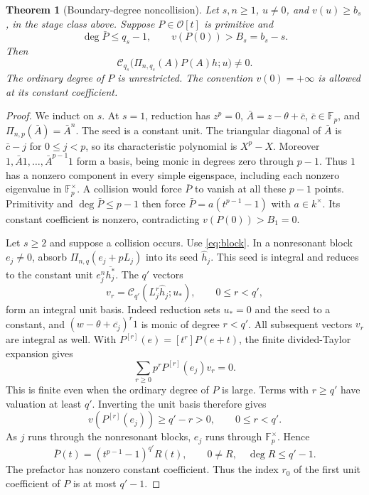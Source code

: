 \documentclass[11pt]{article}
\newtheorem{theorem}[lemma]{Theorem}
\begin{document}
\begin{theorem}[Boundary-degree noncollision]\label{thm:boundary}
Let $s,n\ge1$, $u\ne0$, and $v(u)\ge b_s$, in the stage class above.
Suppose $P\in\mathcal O[t]$ is primitive and
\[
 \deg\bar P\le q_s-1,\qquad v(P(0))>B_s=b_s-s.
\]
Then
\[
 \mathcal C_{q_s}\bigl(\Pi_{n,q_s}(A)P(A)h;u\bigr)\ne0.
\]
The ordinary degree of $P$ is unrestricted.
The convention $v(0)=+\infty$ is allowed at its constant coefficient.
\end{theorem}
\begin{proof}
We induct on $s$. At $s=1$, reduction has $z^p=0$,
$\bar A=z-\theta+\bar c$, $\bar c\in\mathbb F_p$,
and $\Pi_{n,p}(\bar A)=\bar A^n$.
The seed is a constant unit.
The triangular diagonal of $\bar A$ is $\bar c-j$ for $0\le j<p$,
so its characteristic polynomial is $X^p-X$.
Moreover $1,\bar A1,\ldots,\bar A^{p-1}1$ form a basis,
being monic in degrees zero through $p-1$.
Thus $1$ has a nonzero component in every simple eigenspace,
including each nonzero eigenvalue in $\mathbb F_p^\times$.
A collision would force $\bar P$ to vanish at all these $p-1$ points.
Primitivity and $\deg\bar P\le p-1$ then force
$\bar P=a(t^{p-1}-1)$ with $a\in k^\times$.
Its constant coefficient is nonzero, contradicting
$v(P(0))>B_1=0$.

Let $s\ge2$ and suppose a collision occurs.
Use \eqref{eq:block}. In a nonresonant block $e_j\ne0$, absorb
$\Pi_{n,q}(e_j+pL_j)$ into its seed $\widehat h_j$.
This seed is integral and reduces to the constant unit
$e_j^n\overline{h_j^*}$.
The $q'$ vectors
\[
 v_r=\mathcal C_{q'}(L_j^r\widehat h_j;u_*),
                  \qquad0\le r<q',
\]
form an integral unit basis. Indeed reduction sets $u_*=0$
and the seed to a constant, and
$(w-\theta+\overline{c_j})^r1$ is monic of degree $r<q'$.
All subsequent vectors $v_r$ are integral as well.
With $P^{[r]}(e)=[t^r]P(e+t)$, the finite divided-Taylor
expansion gives
\[
 \sum_{r\ge0}p^rP^{[r]}(e_j)v_r=0.
\]
This is finite even when the ordinary degree of $P$ is large.
Terms with $r\ge q'$ have valuation at least $q'$.
Inverting the unit basis therefore gives
\[
 v(P^{[r]}(e_j))\ge q'-r>0,\qquad0\le r<q'.
\]
As $j$ runs through the nonresonant blocks, $e_j$ runs through
$\mathbb F_p^\times$. Hence
\[
 \bar P(t)=(t^{p-1}-1)^{q'}R(t),\qquad
                 0\ne R,\quad\deg R\le q'-1.            \tag{2}\label{eq:residualfactor}
\]
The prefactor has nonzero constant coefficient.
Thus the index $r_0$ of the first unit coefficient of $P$
is at most $q'-1$.


\end{proof}
\end{document}
